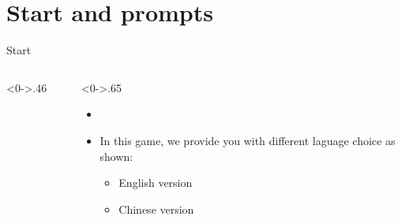 \documentclass[notheorems]{beamer}
\begin{document}
\section{Start and prompts}

\begin{framenl}{Start}
\begin{columns}[T]
	\begin{column}<0->{.46\textwidth}
		\begin{figure}[thpb]
			\centering
			
			
		\end{figure}
	\end{column}%
	\hfill%
	\begin{column}<0->{.65\textwidth}
		\begin{itemize}
			\item []
			\item [] In this game, we provide you with different laguage choice as shown: 
				\begin{itemize}
					\item English version
					\item Chinese version
				\end{itemize}
		\end{itemize}
	\end{column}%
\end{columns}
\end{framenl}
\end{document}

